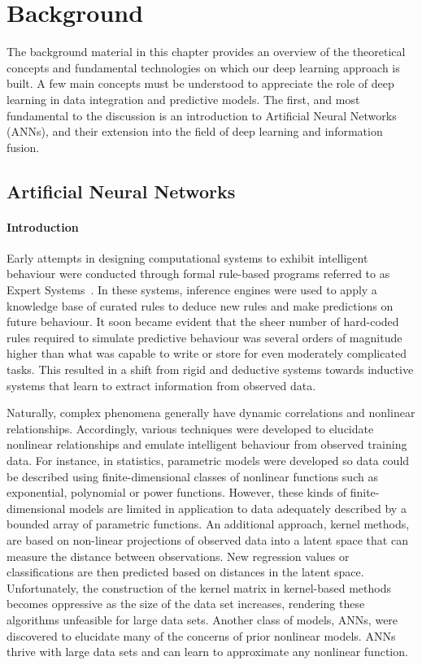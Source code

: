 \chapter{Background}\label{chap:background}

The background material in this chapter provides an overview of the theoretical concepts and fundamental technologies on which our deep learning approach is built. A few main concepts must be understood to appreciate the role of deep learning in data integration and predictive models. The first, and most fundamental to the discussion is an introduction to Artificial Neural Networks (ANNs), and their extension into the field of deep learning and information fusion. 

\section{Artificial Neural Networks}\label{sec:ann}
\subsubsection{Introduction}

Early attempts in designing computational systems to exhibit intelligent behaviour were conducted through formal rule-based programs referred to as Expert Systems~\cite{weiss1991computer}. In these systems, inference engines were used to apply a knowledge base of curated rules to deduce new rules and make predictions on future behaviour. It soon became evident that the sheer number of hard-coded rules required to simulate predictive behaviour was several orders of magnitude higher than what was capable to write or store for even moderately complicated tasks. This resulted in a shift from rigid and deductive systems towards inductive systems that learn to extract information from observed data. 

Naturally, complex phenomena generally have dynamic correlations and nonlinear relationships. Accordingly, various techniques were developed to elucidate nonlinear relationships and emulate intelligent behaviour from observed training data. For instance, in statistics, parametric models were developed so data could be described using finite-dimensional classes of nonlinear functions such as exponential, polynomial or power functions. However, these kinds of finite-dimensional models are limited in application to data adequately described by a bounded array of parametric functions. An additional approach, kernel methods, are based on non-linear projections of observed data into a latent space that can measure the distance between observations. New regression values or classifications are then predicted based on distances in the latent space. Unfortunately, the construction of the kernel matrix in kernel-based methods becomes oppressive as the size of the data set increases, rendering these algorithms unfeasible for large data sets. Another class of models, ANNs, were discovered to elucidate many of the concerns of prior nonlinear models. ANNs thrive with large data sets and can learn to approximate any nonlinear function.

